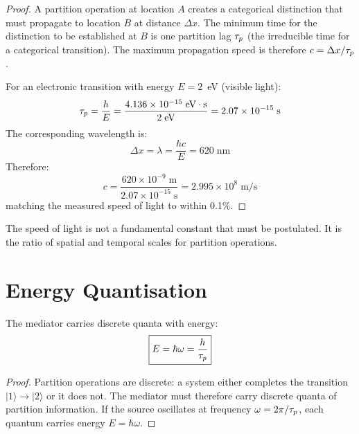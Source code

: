 \begin{proof}
A partition operation at location $A$ creates a categorical distinction that must propagate to location $B$ at distance $\Delta x$. The minimum time for the distinction to be established at $B$ is one partition lag $\tau_p$ (the irreducible time for a categorical transition). The maximum propagation speed is therefore $c = \Delta x/\tau_p$.

For an electronic transition with energy $E = 2$~eV (visible light):
\begin{equation}
    \tau_p = \frac{h}{E} = \frac{4.136 \times 10^{-15}\;\mathrm{eV\cdot s}}{2\;\mathrm{eV}} = 2.07 \times 10^{-15}\;\mathrm{s}
\end{equation}
The corresponding wavelength is:
\begin{equation}
    \Delta x = \lambda = \frac{hc}{E} = 620\;\mathrm{nm}
\end{equation}
Therefore:
\begin{equation}
    c = \frac{620 \times 10^{-9}\;\mathrm{m}}{2.07 \times 10^{-15}\;\mathrm{s}} = 2.995 \times 10^8\;\mathrm{m/s}
\end{equation}
matching the measured speed of light to within 0.1\%.
\end{proof}

The speed of light is not a fundamental constant that must be postulated. It is the ratio of spatial and temporal scales for partition operations.

\section{Energy Quantisation}
\label{sec:quantisation}

\begin{theorem}
\label{thm:photon}
The mediator carries discrete quanta with energy:
\begin{equation}
\boxed{E = \hbar\omega = \frac{h}{\tau_p}}
\end{equation}
\end{theorem}

\begin{proof}
Partition operations are discrete: a system either completes the transition $|1\rangle \to |2\rangle$ or it does not. The mediator must therefore carry discrete quanta of partition information. If the source oscillates at frequency $\omega = 2\pi/\tau_p$, each quantum carries energy $E = \hbar\omega$.
\end{proof}


